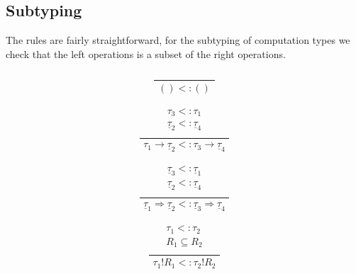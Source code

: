 \documentclass[12pt]{article}
\newcommand\type[0]{\tau}
\newcommand\tunit[0]{()}
\newcommand\tarr[2]{#1 \rightarrow #2}
\newcommand\thandler[2]{#1 \Rightarrow #2}
\newcommand\ctype[0]{\underline{\type}}
\newcommand\cdirt[2]{#1 ! #2}
\begin{document}
\subsection{Subtyping}
The rules are fairly straightforward, for the subtyping of computation types we check that the left operations is a subset of the right operations. \\
\begin{minipage}{0.5\textwidth}
\[\frac{
	\begin{array}{l}
	
	\end{array}
}{
	\begin{array}{l}
	\tunit <: \tunit
	\end{array}
}\]
\end{minipage}
\begin{minipage}{0.5\textwidth}
\[\frac{
	\begin{array}{l}
	\type_3 <: \type_1 \\
	\ctype_2 <: \ctype_4 \\
	\end{array}
}{
	\begin{array}{l}
	\tarr{\type_1}{\ctype_2} <: \tarr{\type_3}{\ctype_4}
	\end{array}
}\]
\end{minipage}
\begin{minipage}{0.5\textwidth}
\[\frac{
	\begin{array}{l}
	\ctype_3 <: \ctype_1 \\
	\ctype_2 <: \ctype_4 \\
	\end{array}
}{
	\begin{array}{l}
	\thandler{\ctype_1}{\ctype_2} <: \thandler{\ctype_3}{\ctype_4}
	\end{array}
}\]
\end{minipage}
\begin{minipage}{0.5\textwidth}
\[\frac{
	\begin{array}{l}
	\type_1 <: \type_2 \\
	R_1 \subseteq R_2 \\
	\end{array}
}{
	\begin{array}{l}
	\cdirt{\type_1}{R_1} <: \cdirt{\type_2}{R_2}
	\end{array}
}\]
\end{minipage}
\end{document}
